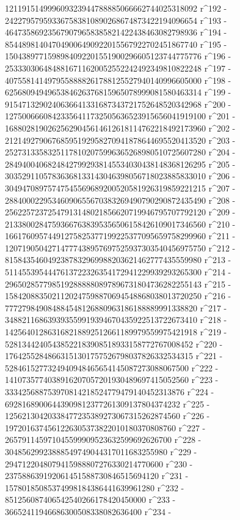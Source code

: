       121191514999609323944788885066662744025318092 r^192 - 
       242279579593367583810890268674873422194096654 r^193 - 
       464735869235679079658385821422438463082798936 r^194 - 
       854489814047049006490922015567922702451867740 r^195 - 
       1504389771598984092201551900296605123744775776 r^196 - 
       2533303064848816711620052552242492349810822248 r^197 - 
       4075581414979558888261788125527940140996605000 r^198 - 
       6256809494965384626376815965078999081580463314 r^199 - 
       9154713290240636641331687343721752648520342968 r^200 - 
       12750066608423356411732505636523915656041919100 r^201 - 
       16880281902625629045614612618114762218492173960 r^202 - 
       21214927906768595192958270941878644695520413520 r^203 - 
       25273133583251178102075996365268980510725607280 r^204 - 
       28494004068248427992938145534030438148368126295 r^205 - 
       30352911057836368133143046398056718023885833010 r^206 - 
       30494708975747545569689200520581926319859221215 r^207 - 
       28840002295346090655670383269490790290872435490 r^208 - 
       25622572372547913148021856620719946795707792120 r^209 - 
       21338002847593667638395356506158426109017346560 r^210 - 
       16617609574491275825377199225377095659758299960 r^211 - 
       12071905042714777438957697525937303540456975750 r^212 - 
       8158435460492387832969988203621462777435559980 r^213 - 
       5114553954447613722326354172941229939293265300 r^214 - 
       2965028577985192888880897896731804736282255143 r^215 - 
       1584208835021120247598870694548868038013720250 r^216 - 
       777279849084884548126880963186188889991338820 r^217 - 
       348821168639393559919394670435922513722673410 r^218 - 
       142564012863168218892512661189979559975421918 r^219 - 
       52813442405438522183908518933158772767008452 r^220 - 
       17642552848663151301757526798037826332534315 r^221 - 
       5284615277324940948465654145087273088067500 r^222 - 
       1410735774038916207057201930489697415052560 r^223 - 
       333425688753970814218524779479140452313876 r^224 - 
       69281689006443909812377261309137804374232 r^225 - 
       12562130420338477235389273067315262874560 r^226 - 
       1972016374561226305373822010180370808760 r^227 - 
       265791145971045599909523632599692626700 r^228 - 
       30485629923888549749044317011683255980 r^229 - 
       2947122048079415988807276330214770600 r^230 - 
       237588639192061451588730846515694120 r^231 - 
       15780185085374998184386441639961280 r^232 - 
       851256087406542540266178420450000 r^233 - 
       36652411946686300508338082636400 r^234 - 

